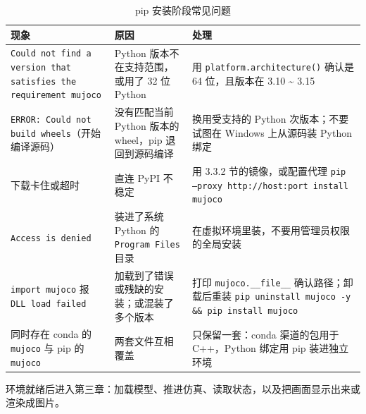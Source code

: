 \begin{table}[H]
	\centering
	\caption{pip 安装阶段常见问题}
	\label{tab:Python:安装报错}
	\footnotesize
	\begin{tabular}{>{\raggedright\arraybackslash}p{5.4cm}>{\raggedright\arraybackslash}p{4.4cm}>{\raggedright\arraybackslash}p{4.6cm}}
		\hline
		现象 & 原因 & 处理 \\
		\hline
		\texttt{Could not find a version that satisfies the requirement mujoco} & Python 版本不在支持范围，或用了 32 位 Python & 用 \texttt{platform.architecture()} 确认是 64 位，且版本在 3.10 \textasciitilde{} 3.15 \\
		\texttt{ERROR: Could not build wheels}（开始编译源码） & 没有匹配当前 Python 版本的 wheel，pip 退回到源码编译 & 换用受支持的 Python 次版本；不要试图在 Windows 上从源码装 Python 绑定 \\
		下载卡住或超时 & 直连 PyPI 不稳定 & 用 3.3.2 节的镜像，或配置代理 \texttt{pip --proxy http://host:port install mujoco} \\
		\texttt{Access is denied} & 装进了系统 Python 的 \texttt{Program Files} 目录 & 在虚拟环境里装，不要用管理员权限的全局安装 \\
		\texttt{import mujoco} 报 \texttt{DLL load failed} & 加载到了错误或残缺的安装；或混装了多个版本 & 打印 \texttt{mujoco.\_\_file\_\_} 确认路径；卸载后重装 \texttt{pip uninstall mujoco -y \&\& pip install mujoco} \\
		同时存在 conda 的 \texttt{mujoco} 与 pip 的 \texttt{mujoco} & 两套文件互相覆盖 & 只保留一套：conda 渠道的包用于 C++，Python 绑定用 pip 装进独立环境 \\
		\hline
	\end{tabular}
\end{table}

\begin{tipbox}[下一步]
	环境就绪后进入第三章：加载模型、推进仿真、读取状态，以及把画面显示出来或渲染成图片。
\end{tipbox}
